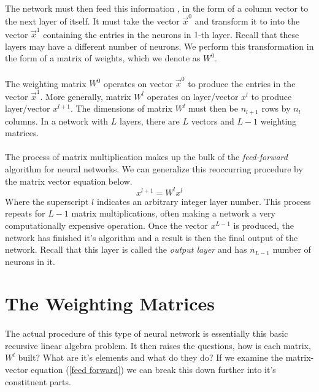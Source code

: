 \documentclass[12pt,letterpaper]{article}
\begin{document}
\paragraph*{}The network must then feed this information , in the form of a column vector to the next layer of itself. It must take the vector $\vec{x}^0$ and transform it to into the vector $\vec{x}^1$ containing the entries in the neurons in $1$-th layer. Recall that these layers may have a different number of neurons. We perform this transformation in the form of a matrix of weights, which we denote as $W^0$.
\paragraph*{}The weighting matrix $W^0$ operates on vector $\vec{x}^0$ to produce the entries in the vector $\vec{x}^1$. More generally, matrix $W^l$ operates on layer/vector $x^l$ to produce layer/vector $x^{l+1}$. The dimensions of matrix $W^l$ must then be $n_{l+1}$ rows by $n_l$ columns. In a network with $L$ layers, there are $L$ vectors and $L-1$ weighting matrices.
\paragraph*{}The process of matrix multiplication makes up the bulk of the \textit{feed-forward} algorithm for neural networks. We can generalize this reoccurring procedure by the matrix vector equation below.
\begin{equation}
\label{feed forward}
x^{l+1} = W^l x^l
\end{equation}
Where the superscript $l$ indicates an arbitrary integer layer number. This process repeats for $L-1$ matrix multiplications, often making a network a very computationally expensive operation. Once the vector $x^{L-1}$ is produced, the network has finished it's algorithm and a result is then the final output of the network. Recall that this layer is called the \textit{output layer} and has $n_{L-1}$ number of neurons in it. 


\section{The Weighting Matrices}
\paragraph*{}The actual procedure of this type of neural network is essentially this basic recursive linear algebra problem. It then raises the questions, how is each matrix, $W^l$ built? What are it's elements and what do they do? If we examine the matrix-vector equation (\ref{feed forward}) we can break this down further into it's constituent parts.
\end{document}
